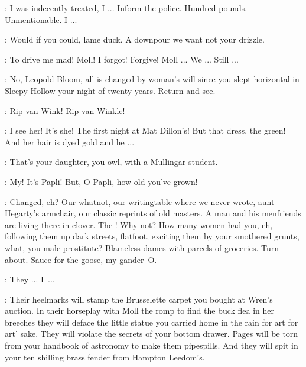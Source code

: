 \Bloom:
I was indecently treated, I ...
Inform the police.
Hundred pounds.
Unmentionable.
I ...

\Bello:
Would if you could, lame duck.
A downpour we want not your drizzle.

\Bloom:
To drive me mad!
Moll!
I forgot!
Forgive!
Moll ...
We ...
Still ...

\Bello:
No, Leopold Bloom, all is changed by woman's will
since you slept horizontal in Sleepy Hollow your night of twenty years.
Return and see.


\SleepyHollow:
Rip van Wink!
Rip van Winkle!

\Bloom:
I see her!
It's she!
The first night at Mat Dillon's!
But that dress, the green!
And her hair is dyed gold and he ...

\Bello:
That's your daughter, you owl, with a Mullingar student.


\Milly:
My!
It's Papli!
But, O Papli, how old you've grown!

\Bello:
Changed, eh?
Our whatnot, our writingtable where we never wrote,
aunt Hegarty's armchair, our classic reprints of old masters.
A man and his menfriends are living there in clover.
The !
Why not?
How many women had you, eh, following them up dark streets, flatfoot,
exciting them by your smothered grunts, what, you male prostitute?
Blameless dames with parcels of groceries.
Turn about.
Sauce for the goose, my gander~O.

\Bloom:
They ... I~...

\Bello:
Their heelmarks will stamp the Brusselette carpet you bought at Wren's auction.
In their horseplay with Moll the romp to find the buck flea in her breeches
they will deface the little statue
you carried home in the rain for art for art' sake.
They will violate the secrets of your bottom drawer.
Pages will be torn from your handbook of astronomy to make them pipespills.
And they will spit in your ten shilling brass fender from Hampton Leedom's.

